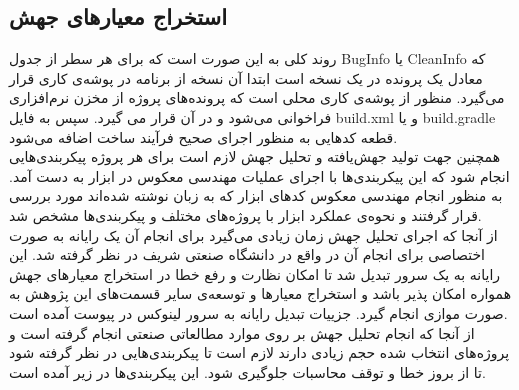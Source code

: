 \subsection{استخراج معیارهای جهش}
روند کلی به این صورت است که برای هر سطر از جدول BugInfo   یا CleanInfo که معادل یک  پرونده  در یک نسخه است ابتدا آن نسخه از برنامه در پوشه‌ی کاری قرار می‌گیرد. منظور از پوشه‌ی کاری محلی است  که پرونده‌های پروژه از مخزن نرم‌افزاری فراخوانی می‌شود و در آن قرار می گیرد. سپس به فایل build.xml    و یا build.gradle  قطعه کدهایی  به منظور  اجرای  صحیح فرآیند ساخت اضافه می‌شود.  \\
همچنین جهت تولید جهش‌یافته و تحلیل جهش لازم است برای هر پروژه پیکربندی‌هایی انجام شود که این پیکربندی‌ها با اجرای عملیات مهندسی معکوس در ابزار  به دست آمد. به منظور انجام مهندسی معکوس کدهای ابزار که به زبان  نوشته شده‌اند مورد بررسی قرار گرفتند و نحوه‌ی عملکرد ابزار با پروژه‌های مختلف و پیکربندی‌ها مشخص شد. \\
از آنجا که اجرای تحلیل جهش زمان زیادی می‌گیرد برای انجام آن یک رایانه به صورت اختصاصی برای انجام آن در  واقع در دانشگاه صنعتی شریف در نظر گرفته شد. این رایانه به یک سرور  تبدیل شد تا امکان نظارت و رفع خطا در استخراج معیارهای جهش همواره امکان پذیر باشد و استخراج معیارها و توسعه‌ی سایر قسمت‌های این پژوهش به صورت موازی انجام گیرد. جزییات تبدیل رایانه به سرور لینوکس در پیوست آمده است. \\
از آنجا که انجام تحلیل جهش بر روی موارد مطالعاتی صنعتی انجام گرفته است و پروژه‌های انتخاب شده حجم زیادی دارند لازم است تا پیکربندی‌هایی در نظر گرفته شود تا از بروز خطا و توقف محاسبات جلوگیری شود. این پیکربندی‌ها در زیر آمده است.  
